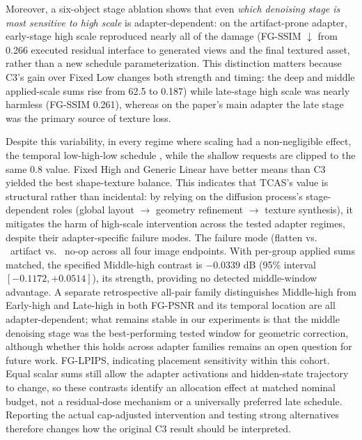 \documentclass[times,twocolumn,final]{elsarticle}
\providecommand{\DIFadd}[1]{{\protect\color{blue} \sf #1}} %
\providecommand{\DIFdel}[1]{{\protect\color{red} \scriptsize #1}} %
\providecommand{\DIFaddbegin}{} %
\providecommand{\DIFaddend}{} %
\providecommand{\DIFdelbegin}{} %
\providecommand{\DIFdelend}{} %
\begin{document}
\DIFdel{Moreover, a six-object stage ablation shows that even \emph{which denoising stage is most sensitive to high scale} is adapter-dependent: on the artifact-prone adapter, early-stage high scale reproduced nearly all of the damage (FG-SSIM $\downarrow$ from 0.266 }\DIFdelend \DIFaddbegin \DIFadd{executed residual interface to generated views and the final textured asset, rather than a new schedule parameterization. This distinction matters because C3's gain over Fixed Low changes both strength and timing: the deep and middle applied-scale sums rise from 62.5 }\DIFaddend to \DIFdelbegin \DIFdel{0.187) while late-stage high scale was nearly harmless (FG-SSIM 0.261), whereas on the paper's main adapter the late stage was the primary source of texture loss.
}%

\DIFdel{Despite this variability, in every regime where scaling had a non-negligible effect, the temporal low-high-low schedule }\DIFdelend \DIFaddbegin \DIFadd{82.5, while the shallow requests are clipped to the same 0.8 value. Fixed High and Generic Linear have better means than }\DIFaddend C3 \DIFdelbegin \DIFdel{yielded the best shape-texture balance. This indicates that TCAS's value is structural rather than incidental: by relying on the diffusion process's stage-dependent roles (global layout $\to$ geometry refinement $\to$ texture synthesis), it mitigates the harm of high-scale intervention across the tested adapter regimes, despite their adapter-specific failure modes. The failure mode (flatten vs. \ artifact vs. \ no-op}\DIFdelend \DIFaddbegin \DIFadd{across all four image endpoints. With per-group applied sums matched, the specified Middle-high contrast is $-0.0339$ dB (95\% interval $[-0.1172,+0.0514]$}\DIFaddend ), \DIFdelbegin \DIFdel{its strength, }\DIFdelend \DIFaddbegin \DIFadd{providing no detected middle-window advantage. A separate retrospective all-pair family distinguishes Middle-high from Early-high and Late-high in both FG-PSNR }\DIFaddend and \DIFdelbegin \DIFdel{its temporal location are all adapter-dependent; what remains stable in our experiments is that the middle denoising stage was the best-performing tested window for geometric correction, although whether this holds across adapter families remains an open question for future work. }\DIFdelend \DIFaddbegin \DIFadd{FG-LPIPS, indicating placement sensitivity within this cohort. Equal scalar sums still allow the adapter activations and hidden-state trajectory to change, so these contrasts identify an allocation effect at matched nominal budget, not a residual-dose mechanism or a universally preferred late schedule. Reporting the actual cap-adjusted intervention and testing strong alternatives therefore changes how the original C3 result should be interpreted.
}\DIFaddend
\end{document}
